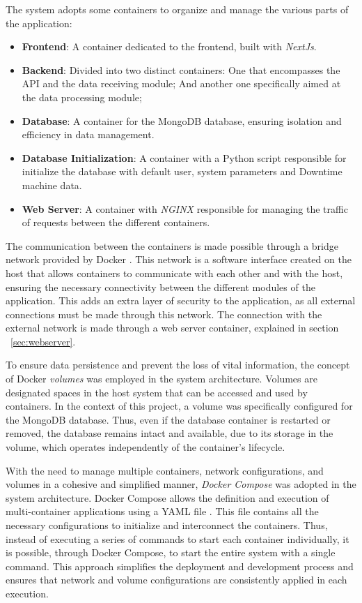 The system adopts some containers to organize and manage the various parts of the application:
\begin{itemize}
    \item \textbf{Frontend}: A container dedicated to the frontend, built with \textit{NextJs}.
    \item \textbf{Backend}: Divided into two distinct containers:
	\subitem One that encompasses the \gls{API} and the data receiving module;
	\subitem And another one specifically aimed at the data processing module;
    \item \textbf{Database}: A container for the MongoDB database, ensuring isolation and efficiency in data management.
    \item \textbf{Database Initialization}: A container with a Python script responsible for initialize the database with default user, system parameters and Downtime machine data.
    \item \textbf{Web Server}: A container with \textit{NGINX} responsible for managing the traffic of requests between the different containers.
\end{itemize}

The communication between the containers is made possible through a bridge network provided by Docker \cite{dockerNetwork}. This network is a software interface created on the host that allows containers to communicate with each other and with the host, ensuring the necessary connectivity between the different modules of the application. This adds an extra layer of security to the application, as all external connections must be made through this network. The connection with the external network is made through a web server container, explained in section ~\ref{sec:webserver}.

To ensure data persistence and prevent the loss of vital information, the concept of Docker \textit{volumes} \cite{dockerVolumes} was employed in the system architecture. Volumes are designated spaces in the host system that can be accessed and used by containers. In the context of this project, a volume was specifically configured for the MongoDB database. Thus, even if the database container is restarted or removed, the database remains intact and available, due to its storage in the volume, which operates independently of the container's lifecycle.

With the need to manage multiple containers, network configurations, and volumes in a cohesive and simplified manner, \textit{Docker Compose} \cite{dockerCompose} was adopted in the system architecture. Docker Compose allows the definition and execution of multi-container applications using a YAML file \cite{yamlOrg}. This file contains all the necessary configurations to initialize and interconnect the containers. Thus, instead of executing a series of commands to start each container individually, it is possible, through Docker Compose, to start the entire system with a single command. This approach simplifies the deployment and development process and ensures that network and volume configurations are consistently applied in each execution.

